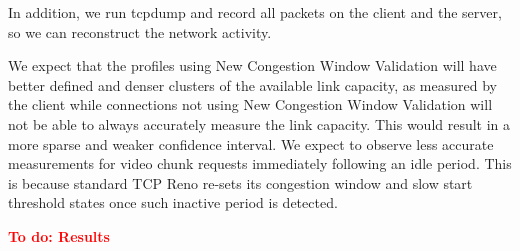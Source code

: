 \documentclass[10pt,sigconf]{acmart}
\newcommand{\todo}[1]{\textbf{\textcolor{red}{To do: #1}}}
\newcommand{\idea}[1]{{\textcolor{blue}{#1}}}
\begin{document}
In addition, we run tcpdump and record all packets on the client and the server, so we can reconstruct the network activity.

We expect that the profiles using New Congestion Window Validation will have better defined and denser clusters of the available link capacity, as measured by the client while connections not using New Congestion Window Validation will not be able to always accurately measure the link capacity. This would result in a more sparse and weaker confidence interval. We expect to observe less accurate measurements for video chunk requests immediately following an idle period. This is because standard TCP Reno re-sets its congestion window and slow start threshold states once such inactive period is detected.

\todo{Results}





\end{document}
